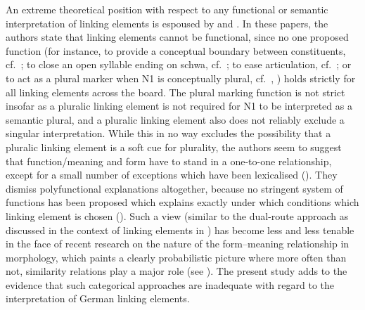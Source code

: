An extreme theoretical position with respect to any functional or semantic interpretation of linking elements is espoused by \textcite{NeefBorgwaldt2012} and \textcite{Neef2015}.
In these papers, the authors state that linking elements cannot be functional, since no one proposed function (for instance, to provide a conceptual boundary between constituents, cf.\ \citealt[530]{Fuhrhop1996}; to close an open syllable ending on schwa, cf.\ \citealt[446]{Wegener2003}; to ease articulation, cf.\ \citealt[177]{Wegener2005}; or to act as a plural marker when N1 is conceptually plural, cf.\ \citealt[534]{Fuhrhop1996}, \citealt[427]{Wegener2003}) holds strictly for all linking elements across the board.
The plural marking function is not strict insofar as a pluralic linking element is not required for N1 to be interpreted as a semantic plural, and a pluralic linking element also does not reliably exclude a singular interpretation.
While this in no way excludes the possibility that a pluralic linking element is a soft cue for plurality, the authors seem to suggest that function\slash meaning and form have to stand in a one-to-one relationship, except for a small number of exceptions which have been lexicalised (\egg \citealt[42]{NeefBorgwaldt2012}).
They dismiss polyfunctional explanations altogether, because no stringent system of functions has been proposed which explains exactly under which conditions which linking element is chosen (\egg \citealt[27--29]{NeefBorgwaldt2012}).
Such a view (similar to the dual-route approach as discussed in the context of linking elements in \citealt{KrottEa2007}) has become less and less tenable in the face of recent research on the nature of the form--meaning relationship in morphology, which paints a clearly probabilistic picture where more often than not, similarity relations play a major role (see \citealt[107]{ArndtlappeEa2016}).
The present study adds to the evidence that such categorical approaches are inadequate with regard to the interpretation of German linking elements.

